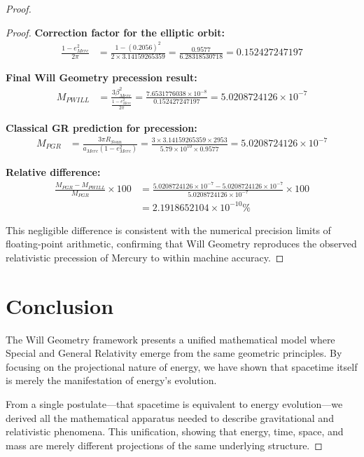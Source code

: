 \documentclass{article}
\begin{document}
\begin{theorem}
\begin{proof}
\begin{proof}
\textbf{Correction factor for the elliptic orbit:}
\begin{align}
\frac{1 - e_{Merc}^{2}}{2\pi} &= \frac{1 - (0.2056)^2}{2 \times 3.14159265359} = \frac{0.9577}{6.28318530718} = 0.152427247197
\end{align}

\textbf{Final Will Geometry precession result:}
\begin{align}
M_{PWILL} &= \frac{3 \beta_{Merc}^{2}}{\frac{1 - e_{Merc}^{2}}{2\pi}} = \frac{7.6531776038 \times 10^{-8}}{0.152427247197} = 5.0208724126 \times 10^{-7}
\end{align}

\textbf{Classical GR prediction for precession:}
\begin{align}
M_{PGR} &= \frac{3\pi R_{Ssun}}{a_{Merc} (1 - e_{Merc}^{2})} = \frac{3 \times 3.14159265359 \times 2953}{5.79 \times 10^{10} \times 0.9577} = 5.0208724126 \times 10^{-7}
\end{align}

\textbf{Relative difference:}
\begin{align}
\frac{M_{PGR} - M_{PWILL}}{M_{PGR}} \times 100 &= \frac{5.0208724126 \times 10^{-7} - 5.0208724126 \times 10^{-7}}{5.0208724126 \times 10^{-7}} \times 100 \\
&= 2.1918652104 \times 10^{-10} \%
\end{align}

This negligible difference is consistent with the numerical precision limits of floating-point arithmetic, confirming that Will Geometry reproduces the observed relativistic precession of Mercury to within machine accuracy.

\end{proof}


\section{Conclusion}

The Will Geometry framework presents a unified mathematical model where Special and General Relativity emerge from the same geometric principles. By focusing on the projectional nature of energy, we have shown that spacetime itself is merely the manifestation of energy's evolution.

From a single postulate—that spacetime is equivalent to energy evolution—we derived all the mathematical apparatus needed to describe gravitational and relativistic phenomena. This unification, showing that energy, time, space, and mass are merely different projections of the same underlying structure.


\end{proof}
\end{theorem}
\end{document}
